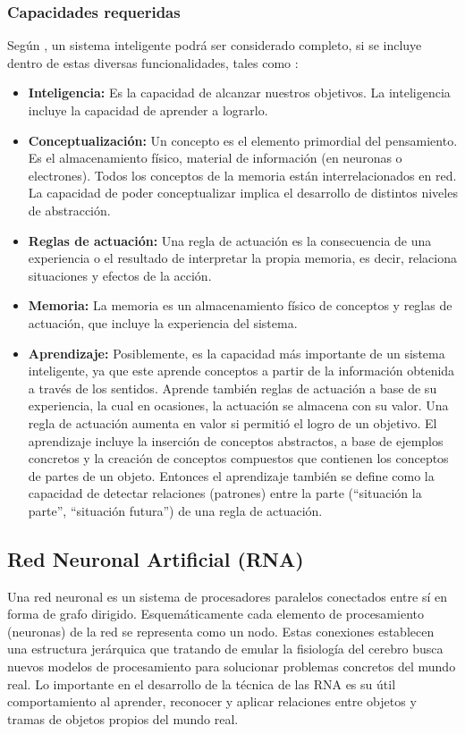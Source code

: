 \subsubsection{Capacidades requeridas}
Según \cite{Alejandro2017}, un sistema inteligente podrá ser considerado completo, si se incluye dentro de estas diversas funcionalidades, tales como :

\begin{itemize}
\item \textbf{Inteligencia:} Es la capacidad de alcanzar nuestros objetivos.  La inteligencia incluye la capacidad de aprender a lograrlo. 
\item \textbf{Conceptualización:} Un concepto es el elemento primordial del pensamiento. Es el almacenamiento físico, material de información (en neuronas o electrones). Todos los conceptos de la memoria están interrelacionados en red. La capacidad de poder conceptualizar implica el desarrollo de distintos niveles de abstracción.
\item \textbf{Reglas de actuación:} Una regla de actuación es la consecuencia de una experiencia o el resultado de interpretar la propia memoria, es decir, relaciona situaciones y efectos de la acción.
\item \textbf{Memoria:} La memoria es un almacenamiento físico de conceptos y reglas de actuación, que incluye la experiencia del sistema.
\item \textbf{Aprendizaje:} Posiblemente, es la capacidad más importante de un sistema inteligente, ya que este aprende conceptos a partir de la información obtenida a través de los sentidos. Aprende también reglas de actuación a base de su experiencia, la cual en ocasiones, la actuación se almacena con su valor. Una regla de actuación aumenta en valor si permitió el logro de un objetivo. El aprendizaje incluye la inserción de conceptos abstractos, a base de ejemplos concretos y la creación de conceptos compuestos que contienen los conceptos de partes de un objeto. Entonces el aprendizaje también se define como la capacidad de detectar relaciones (patrones) entre la parte (``situación la parte'', ``situación futura'') de una regla de actuación.
\end{itemize}

\subsection{Red Neuronal Artificial (RNA)}
Una red neuronal es un sistema de procesadores paralelos conectados entre sí en forma de grafo dirigido. Esquemáticamente cada elemento de procesamiento (neuronas) de la red se
representa como un nodo. Estas conexiones
establecen una estructura jerárquica que tratando de
emular la fisiología del cerebro busca nuevos
modelos de procesamiento para solucionar
problemas concretos del mundo real. Lo importante
en el desarrollo de la técnica de las RNA es su útil
comportamiento al aprender, reconocer y aplicar
relaciones entre objetos y tramas de objetos propios
del mundo real. \citep{freeman1991neural}

